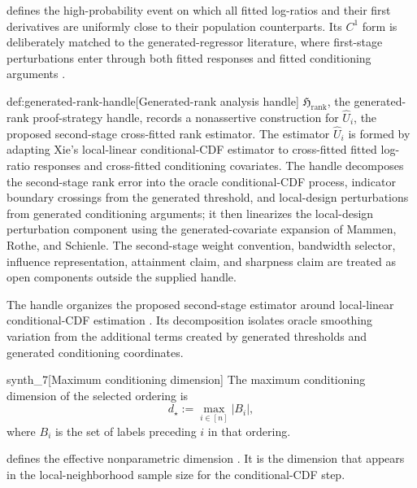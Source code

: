  defines the high-probability event  on which all fitted log-ratios and their first derivatives are uniformly close to their population counterparts. Its \(C^1\) form is deliberately matched to the generated-regressor literature, where first-stage perturbations enter through both fitted responses and fitted conditioning arguments \citep{Pagan1984,MammenRotheSchienle2012GeneratedCovariates,Lee2018PartialMeanGeneratedRegressors}.

\begin{remarkv}{def:generated-rank-handle}[Generated-rank analysis handle]
\(\mathfrak H_{\mathrm{rank}}\), the generated-rank proof-strategy handle, records a nonassertive construction for \(\widehat U_i\), the proposed second-stage cross-fitted rank estimator. The estimator \(\widehat U_i\) is formed by adapting Xie's local-linear conditional-CDF estimator to cross-fitted fitted log-ratio responses and cross-fitted conditioning covariates. The handle decomposes the second-stage rank error into the oracle conditional-CDF process, indicator boundary crossings from the generated threshold, and local-design perturbations from generated conditioning arguments; it then linearizes the local-design perturbation component using the generated-covariate expansion of Mammen, Rothe, and Schienle. The second-stage weight convention, bandwidth selector, influence representation, attainment claim, and sharpness claim are treated as open components outside the supplied handle.
\end{remarkv}

The handle  organizes the proposed second-stage estimator  around local-linear conditional-CDF estimation \citep{FanGijbels1996,Fan1996,Xie2023UniformConditionalCDF}. Its decomposition isolates oracle smoothing variation from the additional terms created by generated thresholds and generated conditioning coordinates.

\begin{definitionv}{synth_7}[Maximum conditioning dimension]
The maximum conditioning dimension of the selected ordering is
\[
d_\star := \max_{i\in[n]} |B_i|,
\]
where \(B_i\) is the set of labels preceding \(i\) in that ordering.
\end{definitionv}

 defines the effective nonparametric dimension . It is the dimension that appears in the local-neighborhood sample size for the conditional-CDF step.

